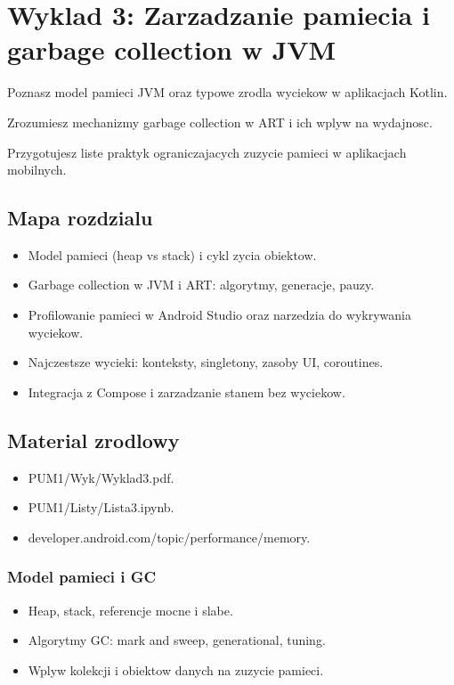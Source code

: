 \chapter{Wyklad 3: Zarzadzanie pamiecia i garbage collection w JVM}

\begin{learningobjectives}
  \item Poznasz model pamieci JVM oraz typowe zrodla wyciekow w aplikacjach Kotlin.
  \item Zrozumiesz mechanizmy garbage collection w ART i ich wplyw na wydajnosc.
  \item Przygotujesz liste praktyk ograniczajacych zuzycie pamieci w aplikacjach mobilnych.
\end{learningobjectives}

\section{Mapa rozdzialu}
\begin{itemize}
  \item Model pamieci (heap vs stack) i cykl zycia obiektow.
  \item Garbage collection w JVM i ART: algorytmy, generacje, pauzy.
  \item Profilowanie pamieci w Android Studio oraz narzedzia do wykrywania wyciekow.
  \item Najczestsze wycieki: konteksty, singletony, zasoby UI, coroutines.
  \item Integracja z Compose i zarzadzanie stanem bez wyciekow.
\end{itemize}

\section{Material zrodlowy}
\begin{itemize}
  \item PUM1/Wyk/Wyklad3.pdf.
  \item PUM1/Listy/Lista3.ipynb.
  \item developer.android.com/topic/performance/memory.
\end{itemize}

\subsection{Model pamieci i GC}
\begin{itemize}
  \item Heap, stack, referencje mocne i slabe.
  \item Algorytmy GC: mark and sweep, generational, tuning.
  \item Wplyw kolekcji i obiektow danych na zuzycie pamieci.
\end{itemize}


